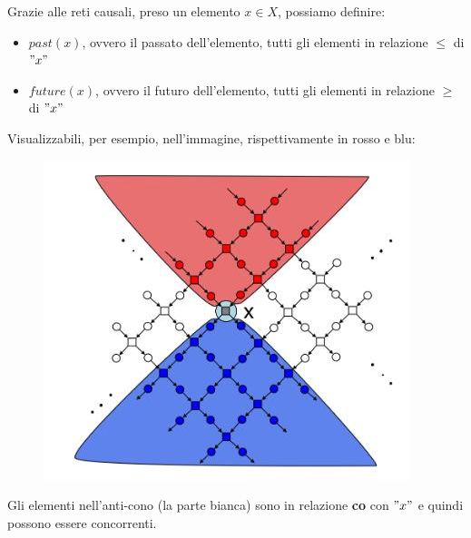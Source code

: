 \begin{definizione}
  Grazie alle reti causali, preso un elemento $x\in X$, possiamo definire:
  \begin{itemize}
    \item $past(x)$, ovvero il passato dell'elemento, tutti gli elementi in
    relazione $\leq$ di $"x"$
    \item $future(x)$, ovvero il futuro dell'elemento, tutti gli elementi in
    relazione $\geq$ di $"x"$
  \end{itemize}
  Visualizzabili, per esempio, nell'immagine, rispettivamente in rosso e blu:
  \begin{figure}[H]
    \centering
    \includegraphics[scale = 0.5]{img/pf.jpg} 
  \end{figure}
  Gli elementi nell'anti-cono (la parte bianca) sono in relazione \textbf{co}
  con $"x"$ e quindi possono essere concorrenti.
\end{definizione} \vspace{5mm} %
